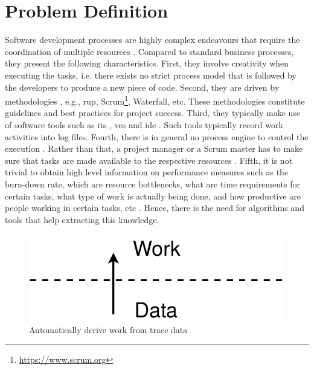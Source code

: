 \section{Problem Definition}
\label{sec:problem-definition}



Software development processes are highly complex endeavours that require the coordination of multiple resources \citep{Kraut1995,Crowston2005}. Compared to standard business processes, they present the following characteristics. First, 
they involve creativity \citep{DeLaBarra2013,DBLP:journals/corr/abs-1305-6045,Aldave2019} when executing the tasks, i.e. there exists no strict process model that is followed by the developers to produce a new piece of code. Second, they are driven by methodologies \citep{Wynekoop1997}, e.g., \gls{rup}, Scrum\footnote{\url{https://www.scrum.org}}, Waterfall, etc. These methodologies constitute guidelines and best practices for project success. Third, they typically make use of software tools \citep{DBLP:books/daglib/0022944} such as \gls{its} , \gls{vcs}  and \gls{ide} . Such tools typically record work activities into log files. Fourth, there is in general no process engine to control the execution \citep{Zahran1998}. Rather than that, a project manager or a Scrum master has to make sure that tasks are made available to the respective resources \citep{DBLP:books/daglib/001480}. Fifth, it is not trivial to obtain high level information on performance measures such as the burn-down rate, which are resource bottlenecks, what are time requirements for certain tasks, what type of work is actually being done, and how productive are people working in certain tasks, etc \citep{DBLP:journals/csur/MeidanGRE18}. Hence, there is the need for algorithms and tools that help extracting this knowledge.

\begin{figure}
	\centering
	\includegraphics[width=0.4\linewidth]{figures/data-to-work}
	\caption{Automatically derive work from trace data}
	\label{fig:data-to-work}
\end{figure}



